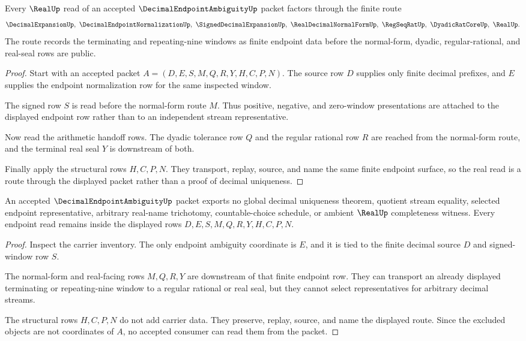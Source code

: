 \begin{theorem}
\label{thm:decimal-endpoint-ambiguity-real-normal-form-route}
Every $\RealUp$ read of an accepted $\DecimalEndpointAmbiguityUp$ packet
factors through the finite route
$$
\DecimalExpansionUp,\ \DecimalEndpointNormalizationUp,\ \SignedDecimalExpansionUp,\ \RealDecimalNormalFormUp,\ \RegSeqRatUp,\ \DyadicRatCoreUp,\ \RealUp .
$$
The route records the terminating and repeating-nine windows as finite
endpoint data before the normal-form, dyadic, regular-rational, and real-seal
rows are public.
\end{theorem}
\begin{proof}
Start with an accepted packet $A=(D,E,S,M,Q,R,Y,H,C,P,N)$. The source row
$D$ supplies only finite decimal prefixes, and $E$ supplies the endpoint
normalization row for the same inspected window.

The signed row $S$ is read before the normal-form route $M$. Thus positive,
negative, and zero-window presentations are attached to the displayed
endpoint row rather than to an independent stream representative.

Now read the arithmetic handoff rows. The dyadic tolerance row $Q$ and the
regular rational row $R$ are reached from the normal-form route, and the
terminal real seal $Y$ is downstream of both.

Finally apply the structural rows $H,C,P,N$. They transport, replay, source,
and name the same finite endpoint surface, so the real read is a route through
the displayed packet rather than a proof of decimal uniqueness.
\end{proof}

\begin{theorem}
\label{thm:decimal-endpoint-ambiguity-nonescape}
An accepted $\DecimalEndpointAmbiguityUp$ packet exports no global decimal
uniqueness theorem, quotient stream equality, selected endpoint
representative, arbitrary real-name trichotomy, countable-choice schedule, or
ambient $\RealUp$ completeness witness. Every endpoint read remains inside
the displayed rows $D,E,S,M,Q,R,Y,H,C,P,N$.
\end{theorem}
\begin{proof}
Inspect the carrier inventory. The only endpoint ambiguity coordinate is
$E$, and it is tied to the finite decimal source $D$ and signed-window row
$S$.

The normal-form and real-facing rows $M,Q,R,Y$ are downstream of that finite
endpoint row. They can transport an already displayed terminating or
repeating-nine window to a regular rational or real seal, but they cannot
select representatives for arbitrary decimal streams.

The structural rows $H,C,P,N$ do not add carrier data. They preserve,
replay, source, and name the displayed route. Since the excluded objects are
not coordinates of $A$, no accepted consumer can read them from the packet.
\end{proof}

